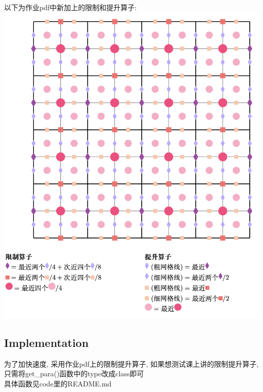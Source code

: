 \documentclass{article}
\begin{document}
以下为作业pdf中新加上的限制和提升算子:\\
\includegraphics[scale=0.5]{image/updownpdf.png}\\
\subsection{Implementation}
为了加快速度, 采用作业pdf上的限制提升算子, 如果想测试课上讲的限制提升算子,
只需将get\_para()函数中的type改成class即可\\
具体函数见code里的README.md\\
\end{document}
